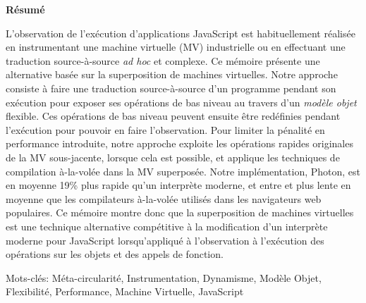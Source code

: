 
\begin{center}
\textbf{\large R\'esum\'e}
\end{center}


\vspace{1cm}

L'observation de l'ex\'ecution d'applications JavaScript est habituellement
r\'ealis\'ee en instrumentant une machine virtuelle (MV) industrielle ou en
effectuant une traduction source-\`a-source \textit{ad hoc} et complexe. Ce
m\'emoire pr\'esente une alternative bas\'ee sur la superposition de machines
virtuelles. Notre approche consiste \`a faire une traduction source-\`a-source
d'un programme pendant son ex\'ecution pour exposer ses op\'erations de bas
niveau au travers d'un \emph{mod\`ele objet} flexible. Ces op\'erations de bas
niveau peuvent ensuite \^etre red\'efinies pendant l'ex\'ecution pour pouvoir
en faire l'observation.  Pour limiter la p\'enalit\'e en performance
introduite, notre approche exploite les op\'erations rapides originales de la
MV sous-jacente, lorsque cela est possible, et applique les techniques de
compilation \`a-la-vol\'ee dans la MV superpos\'ee.  Notre impl\'ementation,
Photon, est en moyenne 19\% plus rapide qu'un interpr\`ete moderne, et entre
 et  plus lente en moyenne que les compilateurs
\`a-la-vol\'ee utilis\'es dans les navigateurs web populaires. Ce m\'emoire
montre donc que la superposition de machines virtuelles est une technique
alternative comp\'etitive \`a la modification d'un interpr\`ete moderne pour
JavaScript lorsqu'appliqu\'e \`a l'observation \`a l'ex\'ecution des
op\'erations sur les objets et des appels de fonction.

Mots-cl\'es: M\'eta-circularit\'e, Instrumentation, Dynamisme, Mod\`ele Objet,
Flexibilit\'e, Performance, Machine Virtuelle, JavaScript  
